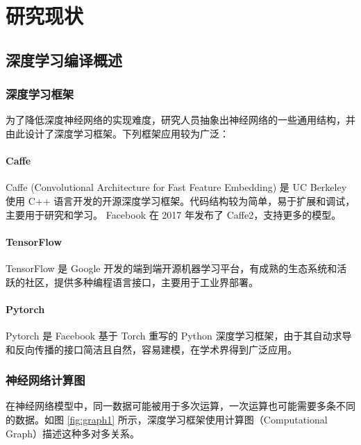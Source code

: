 
\chapter{研究现状}

\section{深度学习编译概述}

\subsection{深度学习框架}
为了降低深度神经网络的实现难度，研究人员抽象出神经网络的一些通用结构，并由此设计了深度学习框架。下列框架应用较为广泛：

\subsubsection{Caffe \cite{jia2014caffe} }
Caffe (Convolutional Architecture for Fast Feature Embedding) 是 UC Berkeley 使用 C++ 语言开发的开源深度学习框架。代码结构较为简单，易于扩展和调试，主要用于研究和学习。
Facebook 在 2017 年发布了 Caffe2，支持更多的模型。

\subsubsection{TensorFlow \cite{Abadi_TensorFlow_Large-scale_machine_2015}}
TensorFlow 是 Google 开发的端到端开源机器学习平台，有成熟的生态系统和活跃的社区，提供多种编程语言接口，主要用于工业界部署。

\subsubsection{Pytorch \cite{NEURIPS2019_9015} }
Pytorch 是 Facebook 基于 Torch 重写的 Python 深度学习框架，由于其自动求导和反向传播的接口简洁且自然，容易建模，在学术界得到广泛应用。

\subsection{神经网络计算图}
  
在神经网络模型中，同一数据可能被用于多次运算，一次运算也可能需要多条不同的数据。如图 \ref{fig:graph1} 所示，深度学习框架使用计算图（Computational Graph）描述这种多对多关系。

